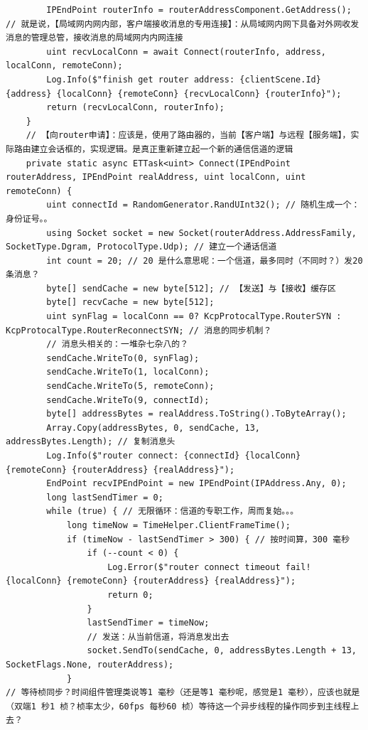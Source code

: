 \documentclass[9pt, b5paper]{article}
\begin{document}
\begin{verbatim}
        IPEndPoint routerInfo = routerAddressComponent.GetAddress(); 
// 就是说，【局域网内网内部，客户端接收消息的专用连接】：从局域网内网下具备对外网收发消息的管理总管，接收消息的局域网内内网连接
        uint recvLocalConn = await Connect(routerInfo, address, localConn, remoteConn); 
        Log.Info($"finish get router address: {clientScene.Id} {address} {localConn} {remoteConn} {recvLocalConn} {routerInfo}");
        return (recvLocalConn, routerInfo);
    }
    // 【向router申请】：应该是，使用了路由器的，当前【客户端】与远程【服务端】，实际路由建立会话框的，实现逻辑。是真正重新建立起一个新的通信信道的逻辑
    private static async ETTask<uint> Connect(IPEndPoint routerAddress, IPEndPoint realAddress, uint localConn, uint remoteConn) {
        uint connectId = RandomGenerator.RandUInt32(); // 随机生成一个：身份证号。。
        using Socket socket = new Socket(routerAddress.AddressFamily, SocketType.Dgram, ProtocolType.Udp); // 建立一个通话信道
        int count = 20; // 20 是什么意思呢：一个信道，最多同时（不同时？）发20 条消息？
        byte[] sendCache = new byte[512]; // 【发送】与【接收】缓存区
        byte[] recvCache = new byte[512];
        uint synFlag = localConn == 0? KcpProtocalType.RouterSYN : KcpProtocalType.RouterReconnectSYN; // 消息的同步机制？
        // 消息头相关的：一堆杂七杂八的？
        sendCache.WriteTo(0, synFlag);
        sendCache.WriteTo(1, localConn);
        sendCache.WriteTo(5, remoteConn);
        sendCache.WriteTo(9, connectId);
        byte[] addressBytes = realAddress.ToString().ToByteArray();
        Array.Copy(addressBytes, 0, sendCache, 13, addressBytes.Length); // 复制消息头
        Log.Info($"router connect: {connectId} {localConn} {remoteConn} {routerAddress} {realAddress}");
        EndPoint recvIPEndPoint = new IPEndPoint(IPAddress.Any, 0);
        long lastSendTimer = 0;
        while (true) { // 无限循环：信道的专职工作，周而复始。。。
            long timeNow = TimeHelper.ClientFrameTime();
            if (timeNow - lastSendTimer > 300) { // 按时间算，300 毫秒
                if (--count < 0) {
                    Log.Error($"router connect timeout fail! {localConn} {remoteConn} {routerAddress} {realAddress}");
                    return 0;
                }
                lastSendTimer = timeNow;
                // 发送：从当前信道，将消息发出去
                socket.SendTo(sendCache, 0, addressBytes.Length + 13, SocketFlags.None, routerAddress);
            }
// 等待桢同步？时间组件管理类说等1 毫秒（还是等1 毫秒呢，感觉是1 毫秒），应该也就是（双端1 秒1 桢？桢率太少，60fps 每秒60 桢）等待这一个异步线程的操作同步到主线程上去？

\end{verbatim}
\end{document}
